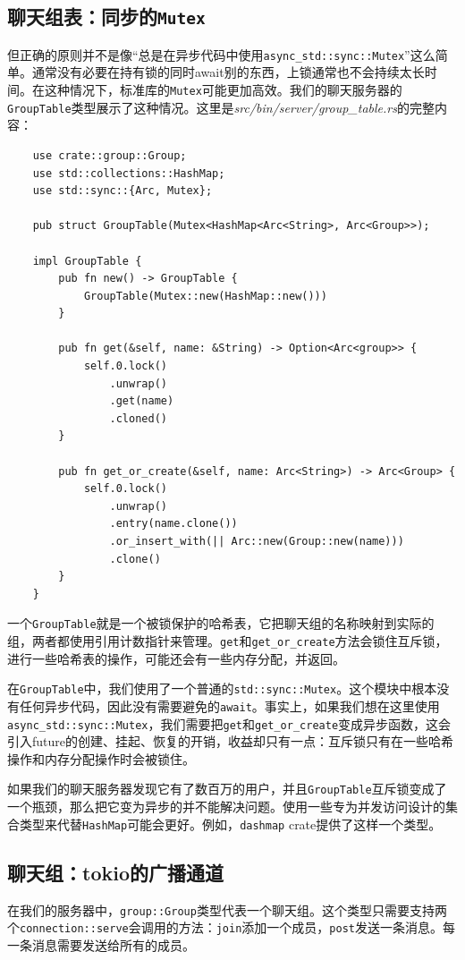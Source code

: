 \subsection{聊天组表：同步的\texttt{Mutex}}
但正确的原则并不是像“总是在异步代码中使用\texttt{async\_std::sync::Mutex}”这么简单。通常没有必要在持有锁的同时await别的东西，上锁通常也不会持续太长时间。在这种情况下，标准库的\texttt{Mutex}可能更加高效。我们的聊天服务器的\texttt{GroupTable}类型展示了这种情况。这里是\emph{src/bin/server/group\_table.rs}的完整内容：
\begin{verbatim}
    use crate::group::Group;
    use std::collections::HashMap;
    use std::sync::{Arc, Mutex};

    pub struct GroupTable(Mutex<HashMap<Arc<String>, Arc<Group>>);

    impl GroupTable {
        pub fn new() -> GroupTable {
            GroupTable(Mutex::new(HashMap::new()))
        }

        pub fn get(&self, name: &String) -> Option<Arc<group>> {
            self.0.lock()
                .unwrap()
                .get(name)
                .cloned()
        }

        pub fn get_or_create(&self, name: Arc<String>) -> Arc<Group> {
            self.0.lock()
                .unwrap()
                .entry(name.clone())
                .or_insert_with(|| Arc::new(Group::new(name)))
                .clone()
        }
    }
\end{verbatim}

一个\texttt{GroupTable}就是一个被锁保护的哈希表，它把聊天组的名称映射到实际的组，两者都使用引用计数指针来管理。\texttt{get}和\texttt{get\_or\_create}方法会锁住互斥锁，进行一些哈希表的操作，可能还会有一些内存分配，并返回。

在\texttt{GroupTable}中，我们使用了一个普通的\texttt{std::sync::Mutex}。这个模块中根本没有任何异步代码，因此没有需要避免的\texttt{await}。事实上，如果我们想在这里使用\texttt{async\_std::sync::Mutex}，我们需要把\texttt{get}和\texttt{get\_or\_create}变成异步函数，这会引入future的创建、挂起、恢复的开销，收益却只有一点：互斥锁只有在一些哈希操作和内存分配操作时会被锁住。

如果我们的聊天服务器发现它有了数百万的用户，并且\texttt{GroupTable}互斥锁变成了一个瓶颈，那么把它变为异步的并不能解决问题。使用一些专为并发访问设计的集合类型来代替\texttt{HashMap}可能会更好。例如，\texttt{dashmap} crate提供了这样一个类型。

\subsection{聊天组：tokio的广播通道}
在我们的服务器中，\texttt{group::Group}类型代表一个聊天组。这个类型只需要支持两个\texttt{connection::serve}会调用的方法：\texttt{join}添加一个成员，\texttt{post}发送一条消息。每一条消息需要发送给所有的成员。

